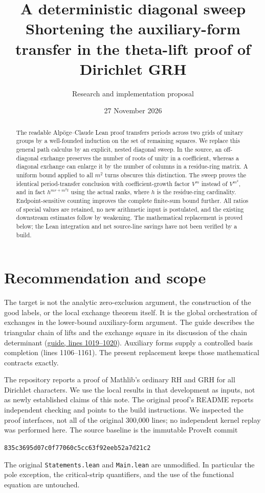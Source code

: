 \documentclass[11pt]{article}
\title{\vspace{-1em}\bfseries A deterministic diagonal sweep\\[2pt]\large Shortening the auxiliary-form transfer in the theta-lift proof of Dirichlet GRH}
\author{Research and implementation proposal}
\date{27 November 2026}
\newcommand{\rev}{835c3695d07c0f77060c5cc63f92eeb52a7d21c2}
\newcommand{\base}{https://github.com/VladimirReshetnikov/ProveIt/blob/835c3695d07c0f77060c5cc63f92eeb52a7d21c2/Analysis/GeneralizedRiemannHypothesis}
\begin{document}
\maketitle
\begin{abstract}
The readable Alp\"oge--Claude Lean proof transfers periods across two grids of unitary groups by a well-founded induction on the set of remaining squares. We replace this general path calculus by an explicit, nested diagonal sweep. In the source, an off-diagonal exchange preserves the number of roots of unity in a coefficient, whereas a diagonal exchange can enlarge it by the number of columns in a residue-ring matrix. A uniform bound applied to all $m^2$ turns obscures this distinction. The sweep proves the identical period-transfer conclusion with coefficient-growth factor $V^m$ instead of $V^{m^2}$, and in fact $h^{mr+m^2t}$ using the actual ranks, where $h$ is the residue-ring cardinality. Endpoint-sensitive counting improves the complete finite-sum bound further. All ratios of special values are retained, no new arithmetic input is postulated, and the existing downstream estimates follow by weakening. The mathematical replacement is proved below; the Lean integration and net source-line savings have not been verified by a build.
\end{abstract}
\tableofcontents
\section{Recommendation and scope}
The target is not the analytic zero-exclusion argument, the construction of the good labels, or the local exchange theorem itself. It is the global orchestration of exchanges in the lower-bound auxiliary-form argument. The guide describes the triangular chain of lifts and the exchange square in its discussion of the chain determinant (\href{\base/docs/guide/theta_lifts_and_dirichlet_zeros.tex\#L1019}{guide, lines 1019--1020}). Auxiliary forms supply a controlled basis completion (lines 1106--1161). The present replacement keeps those mathematical contracts exactly.

The repository reports a proof of Mathlib's ordinary RH and GRH for all Dirichlet characters. We use the local results in that development as inputs, not as newly established claims of this note. The original proof's README reports independent checking and points to the build instructions. We inspected the proof interfaces, not all of the original 300,000 lines; no independent kernel replay was performed here. The source baseline is the immutable ProveIt commit
\begin{center}\small\texttt{\rev}\end{center}
The original \texttt{Statements.lean} and \texttt{Main.lean} are unmodified. In particular the pole exception, the critical-strip quantifiers, and the use of the functional equation are untouched.
\end{document}
